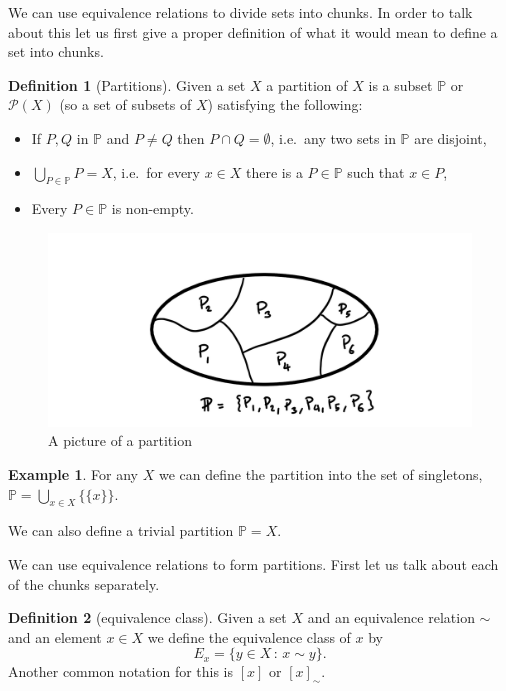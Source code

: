\documentclass[
]{book}
\theoremstyle{definition}
\newtheorem{definition}{Definition}[chapter]
\theoremstyle{definition}
\newtheorem{example}{Example}[chapter]
\theoremstyle{definition}
\theoremstyle{definition}
\theoremstyle{remark}
\begin{document}
We can use equivalence relations to divide sets into chunks. In order to talk about this let us first give a proper definition of what it would mean to define a set into chunks.

\begin{definition}[Partitions]

Given a set \(X\) a partition of \(X\) is a subset \(\mathbb{P}\) or \(\mathcal{P}(X)\) (so a set of subsets of \(X\)) satisfying the following:

\begin{itemize}
\item
  If \(P, Q\) in \(\mathbb{P}\) and \(P \neq Q\) then \(P \cap Q = \emptyset\), i.e.~any two sets in \(\mathbb{P}\) are disjoint,
\item
  \(\bigcup_{P \in \mathbb{P}}P = X\), i.e.~for every \(x \in X\) there is a \(P \in \mathbb{P}\) such that \(x \in P\),
\item
  Every \(P \in \mathbb{P}\) is non-empty.
\end{itemize}

\end{definition}

\begin{figure}
\centering
\includegraphics{partition.png}
\caption{\label{fig:unnamed-chunk-25}A picture of a partition}
\end{figure}

\begin{example}
For any \(X\) we can define the partition into the set of singletons, \(\mathbb{P}= \bigcup_{x \in X}\{\{x\}\}\).

We can also define a trivial partition \(\mathbb{P} = X\).
\end{example}

We can use equivalence relations to form partitions. First let us talk about each of the chunks separately.

\begin{definition}[equivalence class]
Given a set \(X\) and an equivalence relation \(\sim\) and an element \(x \in X\) we define the equivalence class of \(x\) by
\[ E_x = \{ y \in X \,:\, x \sim y\}.\]
Another common notation for this is \([x]\) or \([x]_\sim\).
\end{definition}
\end{document}
